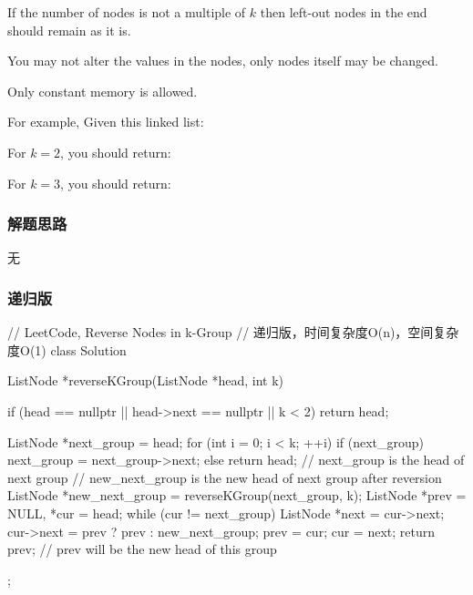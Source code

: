 If the number of nodes is not a multiple of $k$ then left-out nodes in the end 
should remain as it is.

You may not alter the values in the nodes, only nodes itself may be changed.

Only constant memory is allowed.

For example,
Given this linked list: 

For $k = 2$, you should return: 

For $k = 3$, you should return: 


\subsubsection{解题思路}
无


\subsubsection{递归版}
\begin{Code}
	// LeetCode, Reverse Nodes in k-Group
	// 递归版，时间复杂度O(n)，空间复杂度O(1)
	class Solution {
		ListNode *reverseKGroup(ListNode *head, int k) {
			if (head == nullptr || head->next == nullptr || k < 2)
				return head;
			
			ListNode *next_group = head;
			for (int i = 0; i < k; ++i) {
				if (next_group)
					next_group = next_group->next;
				else
					return head;
			}
			// next_group is the head of next group
			// new_next_group is the new head of next group after reversion
			ListNode *new_next_group = reverseKGroup(next_group, k);
			ListNode *prev = NULL, *cur = head;
			while (cur != next_group) {
				ListNode *next = cur->next;
				cur->next = prev ? prev : new_next_group;
				prev = cur;
				cur = next;
			}
			return prev; // prev will be the new head of this group
		}
	};
\end{Code}



